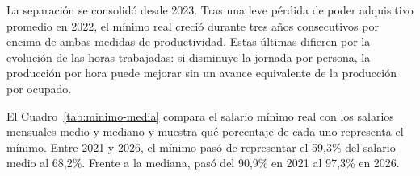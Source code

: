 La separación se consolidó desde 2023. Tras una leve pérdida de poder adquisitivo promedio en 2022, el mínimo real creció durante tres años consecutivos por encima de ambas medidas de productividad. Estas últimas difieren por la evolución de las horas trabajadas: si disminuye la jornada por persona, la producción por hora puede mejorar sin un avance equivalente de la producción por ocupado. %





El Cuadro~\ref{tab:minimo-media} compara el salario mínimo real con los salarios mensuales medio y mediano y muestra qué porcentaje de cada uno representa el mínimo. Entre 2021 y 2026, el mínimo pasó de representar el 59,3\% del salario medio al 68,2\%. Frente a la mediana, pasó del 90,9\% en 2021 al 97,3\% en 2026.




